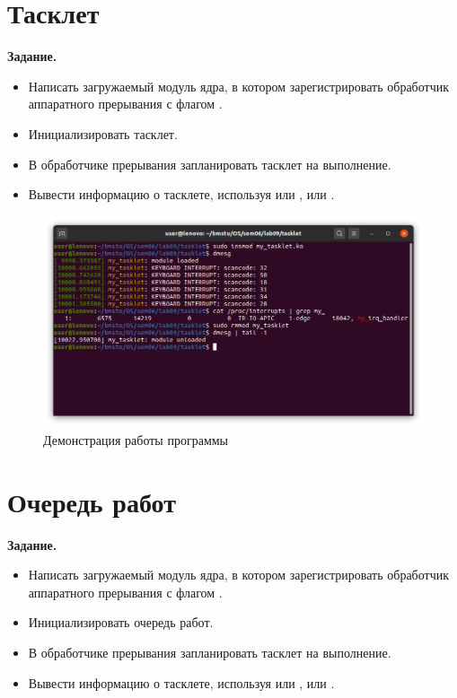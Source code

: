\documentclass[a4paper,oneside,12pt]{extreport}
\begin{document}


\section*{Тасклет}

\textbf{Задание.}
\begin{itemize}
	\item Написать загружаемый модуль ядра, в котором зарегистрировать обработчик аппаратного прерывания с флагом .
	\item Инициализировать тасклет.
	\item В обработчике прерывания запланировать тасклет на выполнение.
	\item Вывести информацию о тасклете, используя или , или .
\end{itemize}



\begin{figure}[H]
	\centering
	\includegraphics[width=\linewidth]{inc/img/tasklet}
	\caption{Демонстрация работы программы}
	\label{img:tasklet}
\end{figure}


\section*{Очередь работ}

\textbf{Задание.}
\begin{itemize}
	\item Написать загружаемый модуль ядра, в котором зарегистрировать обработчик аппаратного прерывания с флагом .
	\item Инициализировать очередь работ.
	\item В обработчике прерывания запланировать тасклет на выполнение.
	\item Вывести информацию о тасклете, используя или , или .
\end{itemize}
\end{document}
